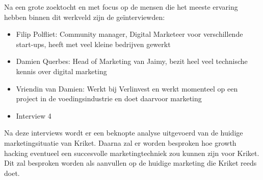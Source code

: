 Na een grote zoektocht en met focus op de mensen die het meeste ervaring hebben binnen dit werkveld zijn de geïnterviewden:
\begin{itemize} 
	\item Filip Polfliet: Community manager, Digital Marketeer voor verschillende start-ups, heeft met veel kleine bedrijven gewerkt
	\item Damien Querbes: Head of Marketing van Jaimy, bezit heel veel technische kennis over digital marketing
	\item Vriendin van Damien: Werkt bij Verlinvest en werkt momenteel op een project in de voedingsindustrie en doet daarvoor marketing
	\item Interview 4
\end{itemize}

Na deze interviews wordt er een beknopte analyse uitgevoerd van de huidige marketingsituatie van Kriket. Daarna zal er worden besproken hoe growth hacking eventueel een succesvolle marketingtechniek zou kunnen zijn voor Kriket. Dit zal besproken worden als aanvullen op de huidige marketing die Kriket reeds doet.
